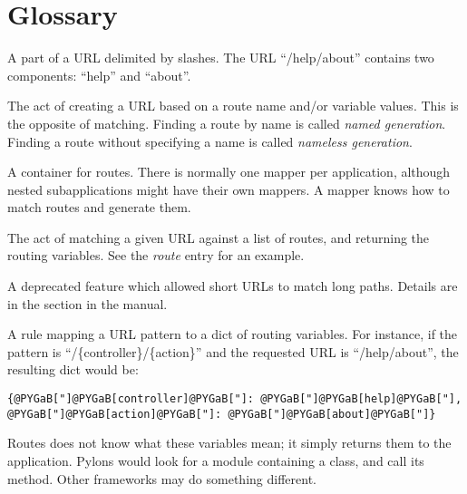 \documentclass[letterpaper,10pt,english]{manual}
\begin{document}
\resetcurrentobjects
\hypertarget{--doc-glossary}{}

\hypertarget{glossary}{}\chapter{Glossary}
\begin{description}
\item[component]\hypertarget{term-component}{}
A part of a URL delimited by slashes.  The URL ``/help/about'' contains
two components: ``help'' and ``about''.

\item[generation]\hypertarget{term-generation}{}
The act of creating a URL based on a route name and/or variable values.
This is the opposite of matching.  Finding a route by name is called
\emph{named generation}.  Finding a route without specifying a name is
called \emph{nameless generation}.

\item[mapper]\hypertarget{term-mapper}{}
A container for routes.  There is normally one mapper per application,
although nested subapplications might have their own mappers.  A
mapper knows how to match routes and generate them.

\item[matching]\hypertarget{term-matching}{}
The act of matching a given URL against a list  of routes, and
returning the routing variables.  See the \emph{route} entry for an example.

\item[minimization]\hypertarget{term-minimization}{}
A deprecated feature which allowed short URLs to match long paths.
Details are in the  section in the manual.

\item[route]\hypertarget{term-route}{}
A rule mapping a URL pattern to a dict of routing  variables.   For
instance, if the pattern is ``/\{controller\}/\{action\}'' and the requested
URL is ``/help/about'', the resulting dict would be:

\begin{Verbatim}[commandchars=@\[\]]
{@PYGaB["]@PYGaB[controller]@PYGaB["]: @PYGaB["]@PYGaB[help]@PYGaB["], @PYGaB["]@PYGaB[action]@PYGaB["]: @PYGaB["]@PYGaB[about]@PYGaB["]}
\end{Verbatim}

Routes does not know what these variables mean; it simply returns them
to the application.  Pylons would look for a 
module containing a  class, and call its 
method.  Other frameworks may do something different.


\end{description}
\end{document}
